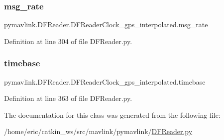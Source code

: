 \subsubsection{\texorpdfstring{msg\_rate}{msg\_rate}}
{\footnotesize\ttfamily pymavlink.\+D\+F\+Reader.\+D\+F\+Reader\+Clock\+\_\+gps\+\_\+interpolated.\+msg\+\_\+rate}



Definition at line 304 of file D\+F\+Reader.\+py.

\mbox{\label{classpymavlink_1_1DFReader_1_1DFReaderClock__gps__interpolated_a54664e7bb953dde5958fe487b95f6d5f}} 
\subsubsection{\texorpdfstring{timebase}{timebase}}
{\footnotesize\ttfamily pymavlink.\+D\+F\+Reader.\+D\+F\+Reader\+Clock\+\_\+gps\+\_\+interpolated.\+timebase}



Definition at line 363 of file D\+F\+Reader.\+py.



The documentation for this class was generated from the following file\+:\begin{DoxyCompactItemize}
\item 
/home/eric/catkin\+\_\+ws/src/mavlink/pymavlink/\mbox{\hyperlink{DFReader_8py}{D\+F\+Reader.\+py}}\end{DoxyCompactItemize}

